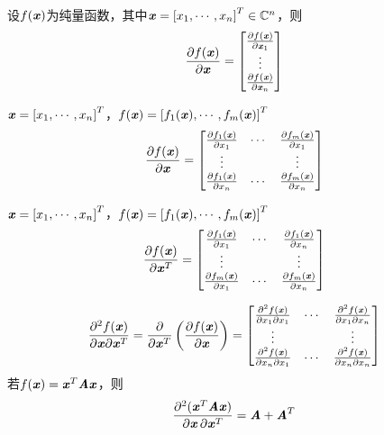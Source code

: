 \begin{definition}
    设$f(\boldsymbol{\mathit{x}})$为纯量函数，其中$\boldsymbol{\mathit{x}} = \left[x_1, \cdots, x_n \right]^T \in \mathbb{C}^n$，则
    \[
        \frac{\partial f(\boldsymbol{\mathit{x}})}{\partial \boldsymbol{\mathit{x}}} = \begin{bmatrix}
            \frac{\partial f(\boldsymbol{\mathit{x}})}{\partial \boldsymbol{\mathit{x}}_1} \\
            \vdots \\
            \frac{\partial f(\boldsymbol{\mathit{x}})}{\partial \boldsymbol{\mathit{x}}_n}
        \end{bmatrix}
    \]
\end{definition}

\begin{definition}
    $\boldsymbol{\mathit{x}} = \left[x_1, \cdots, x_n \right]^T$，$f(\boldsymbol{\mathit{x}}) = \left[f_1(\boldsymbol{\mathit{x}}), \cdots, f_m(\boldsymbol{\mathit{x}}) \right]^T$
    \[
        \frac{\partial f(\boldsymbol{\mathit{x}})}{\partial \boldsymbol{\mathit{x}}} = \begin{bmatrix}
            \frac{\partial f_1(\boldsymbol{\mathit{x}})}{\partial x_1}  & \cdots & \frac{\partial f_m(\boldsymbol{\mathit{x}})}{\partial x_1} \\
            \vdots & & \vdots \\
            \frac{\partial f_1(\boldsymbol{\mathit{x}})}{\partial x_n}  & \cdots & \frac{\partial f_m(\boldsymbol{\mathit{x}})}{\partial x_n}
        \end{bmatrix}
        \]
\end{definition}

\begin{definition}[Jacobi矩阵]
    $\boldsymbol{\mathit{x}} = \left[x_1, \cdots, x_n \right]^T$，$f(\boldsymbol{\mathit{x}}) = \left[f_1(\boldsymbol{\mathit{x}}), \cdots, f_m(\boldsymbol{\mathit{x}}) \right]^T$
    \[
        \frac{\partial f(\boldsymbol{\mathit{x}})}{\partial \boldsymbol{\mathit{x}}^T} = \begin{bmatrix}
            \frac{\partial f_1(\boldsymbol{\mathit{x}})}{\partial x_1}  & \cdots & \frac{\partial f_1(\boldsymbol{\mathit{x}})}{\partial x_n} \\
            \vdots & & \vdots \\
            \frac{\partial f_m(\boldsymbol{\mathit{x}})}{\partial x_1}  & \cdots & \frac{\partial f_m(\boldsymbol{\mathit{x}})}{\partial x_n}
        \end{bmatrix}
        \]
\end{definition}


\begin{definition}[Hessian矩阵]
    \[
        \frac{\partial^2 f(\boldsymbol{\mathit{x}})}{\partial \boldsymbol{\mathit{x}} \partial \boldsymbol{\mathit{x}}^T } = \frac{\partial}{\partial \boldsymbol{\mathit{x}}^T} \left(\frac{\partial f(\boldsymbol{\mathit{x}})}{\partial \boldsymbol{\mathit{x}}} \right) = \begin{bmatrix}
            \frac{\partial^2 f(\boldsymbol{\mathit{x}})}{\partial x_1 \partial x_1} &  \cdots & \frac{\partial^2 f(\boldsymbol{\mathit{x}})}{\partial x_1 \partial x_n} \\
            \vdots & & \vdots \\
            \frac{\partial^2 f(\boldsymbol{\mathit{x}})}{\partial x_n \partial x_1} &  \cdots & \frac{\partial^2 f(\boldsymbol{\mathit{x}})}{\partial x_n \partial x_n}
        \end{bmatrix}
    \]
若$f(\boldsymbol{\mathit{x}}) = \boldsymbol{\mathit{x}}^T\boldsymbol{\mathit{A}}\boldsymbol{\mathit{x}}$，则
    \[
        \frac{\partial^2(\boldsymbol{\mathit{x}}^T\boldsymbol{\mathit{A}}\boldsymbol{\mathit{x}})}{\partial \boldsymbol{\mathit{x}} \, \partial \boldsymbol{\mathit{x}}^T} = \boldsymbol{\mathit{A}} + \boldsymbol{\mathit{A}}^T
    \]
\end{definition}

